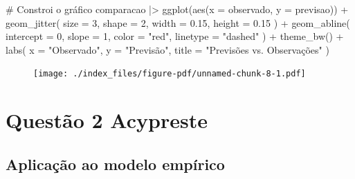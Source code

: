 \documentclass[
  letterpaper,
  DIV=11,
  numbers=noendperiod]{scrreprt}
\newenvironment{Shaded}{\begin{snugshade}}{\end{snugshade}}
\newcommand{\AttributeTok}[1]{\textcolor[rgb]{0.40,0.45,0.13}{#1}}
\newcommand{\CommentTok}[1]{\textcolor[rgb]{0.37,0.37,0.37}{#1}}
\newcommand{\DecValTok}[1]{\textcolor[rgb]{0.68,0.00,0.00}{#1}}
\newcommand{\FloatTok}[1]{\textcolor[rgb]{0.68,0.00,0.00}{#1}}
\newcommand{\FunctionTok}[1]{\textcolor[rgb]{0.28,0.35,0.67}{#1}}
\newcommand{\NormalTok}[1]{\textcolor[rgb]{0.00,0.23,0.31}{#1}}
\newcommand{\SpecialCharTok}[1]{\textcolor[rgb]{0.37,0.37,0.37}{#1}}
\newcommand{\StringTok}[1]{\textcolor[rgb]{0.13,0.47,0.30}{#1}}
\begin{document}
\begin{Shaded}
\begin{Highlighting}[]
\CommentTok{\# Constroi o gráfico}
\NormalTok{comparacao }\SpecialCharTok{|\textgreater{}}
    \FunctionTok{ggplot}\NormalTok{(}\FunctionTok{aes}\NormalTok{(}\AttributeTok{x =}\NormalTok{ observado, }\AttributeTok{y =}\NormalTok{ previsao)) }\SpecialCharTok{+}
    \FunctionTok{geom\_jitter}\NormalTok{(}
        \AttributeTok{size =} \DecValTok{3}\NormalTok{, }\AttributeTok{shape =} \DecValTok{2}\NormalTok{,}
        \AttributeTok{width =} \FloatTok{0.15}\NormalTok{, }\AttributeTok{height =} \FloatTok{0.15}
\NormalTok{    ) }\SpecialCharTok{+}
    \FunctionTok{geom\_abline}\NormalTok{(}
        \AttributeTok{intercept =} \DecValTok{0}\NormalTok{,}
        \AttributeTok{slope =} \DecValTok{1}\NormalTok{,}
        \AttributeTok{color =} \StringTok{"red"}\NormalTok{,}
        \AttributeTok{linetype =} \StringTok{"dashed"}
\NormalTok{    ) }\SpecialCharTok{+}
    \FunctionTok{theme\_bw}\NormalTok{() }\SpecialCharTok{+}
    \FunctionTok{labs}\NormalTok{(}
        \AttributeTok{x =} \StringTok{"Observado"}\NormalTok{,}
        \AttributeTok{y =} \StringTok{"Previsão"}\NormalTok{,}
        \AttributeTok{title =} \StringTok{"Previsões vs. Observações"}
\NormalTok{    )}
\end{Highlighting}
\end{Shaded}

\begin{figure}[H]

{\centering \texttt{[image: ./index\_files/figure-pdf/unnamed-chunk-8-1.pdf]}

}

\end{figure}


\hypertarget{questuxe3o-2-acypreste}{%
\chapter*{Questão 2 Acypreste}\label{questuxe3o-2-acypreste}}


\hypertarget{aplicauxe7uxe3o-ao-modelo-empuxedrico-1}{%
\section*{Aplicação ao modelo
empírico}\label{aplicauxe7uxe3o-ao-modelo-empuxedrico-1}}
\end{document}
